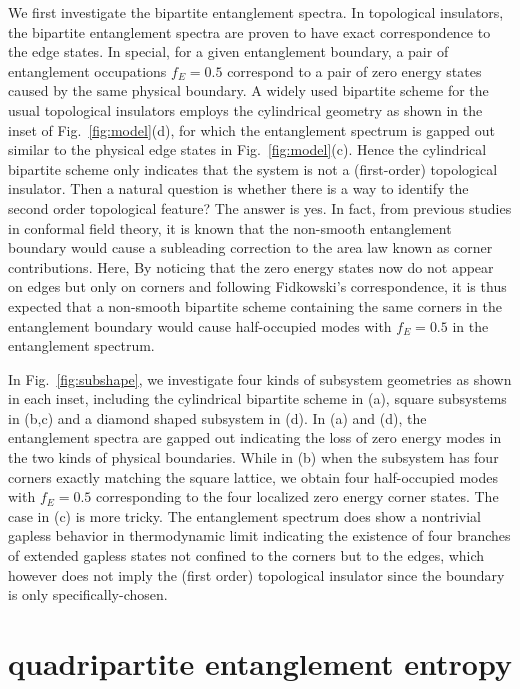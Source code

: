 \documentclass[twocolumn,superscriptaddress]{revtex4-1}
\begin{document}
We first investigate the bipartite entanglement spectra. In topological insulators, the bipartite entanglement spectra are proven to have exact correspondence to the edge states. \cite{Fidkowski_PRL_2010} In special, for a given entanglement boundary, a pair of entanglement occupations $f_{E}=0.5$ correspond to a pair of zero energy states caused by the same physical boundary. A widely used bipartite scheme for the usual topological insulators employs the cylindrical geometry as shown in the inset of Fig.~\ref{fig:model}(d), for which the entanglement spectrum is gapped out similar to the physical edge states in Fig.~\ref{fig:model}(c). Hence the cylindrical bipartite scheme only indicates that the system is not a (first-order) topological insulator. Then a natural question is whether there is a way to identify the second order topological feature? The answer is yes. In fact, from previous studies in conformal field theory, it is known that the non-smooth entanglement boundary would cause a subleading correction to the area law known as corner contributions. \cite{Laflorencie_PR_2016} Here, By noticing that the zero energy states now do not appear on edges but only on corners and following Fidkowski's correspondence, it is thus expected that a non-smooth bipartite scheme containing the same corners in the entanglement boundary would cause half-occupied modes with $f_E=0.5$ in the entanglement spectrum.

In Fig.~\ref{fig:subshape}, we investigate four kinds of subsystem geometries as shown in each inset, including the cylindrical bipartite scheme in (a), square subsystems in (b,c) and a diamond shaped subsystem in (d). In (a) and (d), the entanglement spectra are gapped out indicating the loss of zero energy modes in the two kinds of physical boundaries. While in (b) when the subsystem has four corners exactly matching the square lattice, we obtain four half-occupied modes with $f_{E}=0.5$ corresponding to the four localized zero energy corner states. The case in (c) is more tricky. The entanglement spectrum does show a nontrivial gapless behavior in thermodynamic limit indicating the existence of four branches of extended gapless states not confined to the corners but to the edges, which however does not imply the (first order) topological insulator since the boundary is only specifically-chosen. 

\section{quadripartite entanglement entropy}
\end{document}
